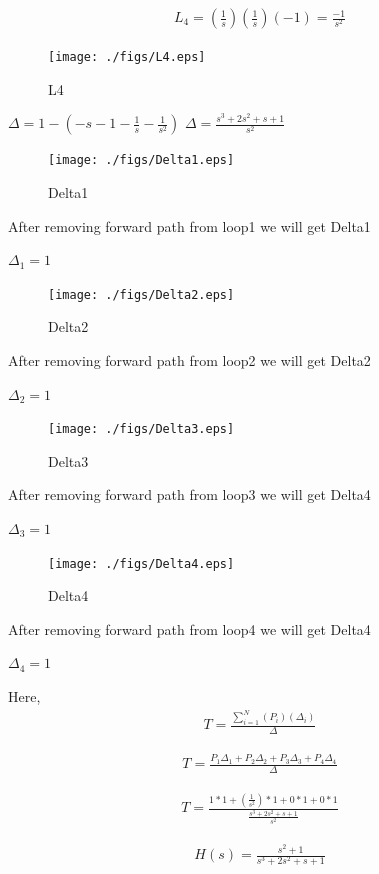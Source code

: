 \begin{enumerate}[label=\thesection.\arabic*.,ref=\thesection.\theenumi]
\begin{align}
L_4=(\frac{1}{s})(\frac{1}{s})(-1)=\frac{-1}{s^2}
\end{align}

\begin{figure}[!ht]
\centering
\texttt{[image: ./figs/L4.eps]}
\caption{L4}
\label{fig:sec_order}
\end{figure}


$\Delta = 1-(-s-1-\frac{1}{s}-\frac{1}{s^2})$
$\Delta = \frac{s^3+2s^2+s+1}{s^2}$

\begin{figure}[!ht]
\centering
\texttt{[image: ./figs/Delta1.eps]}
\caption{Delta1}
\label{fig:sec_order}
\end{figure}

After removing forward path from loop1 we will get Delta1

$\Delta_1 = 1$

\begin{figure}[!ht]
\centering
\texttt{[image: ./figs/Delta2.eps]}
\caption{Delta2}
\label{fig:sec_order}
\end{figure}

After removing forward path from loop2 we will get Delta2

$\Delta_2 = 1$

\begin{figure}[!ht]
\centering
\texttt{[image: ./figs/Delta3.eps]}
\caption{Delta3}
\label{fig:sec_order}
\end{figure}

After removing forward path from loop3 we will get Delta4

$\Delta_3 = 1$

\begin{figure}[!ht]
\centering
\texttt{[image: ./figs/Delta4.eps]}
\caption{Delta4}
\label{fig:sec_order}
\end{figure}

After removing forward path from loop4 we will get Delta4

$\Delta_4 = 1$

Here, 
\begin{align}
T=\frac{\sum_{i=1}^{N}(P_i)(\Delta_i)}{\Delta}
\end{align}

\begin{align}
T=\frac{P_1 \Delta_1+P_2 \Delta_2+P_3 \Delta_3+P_4 \Delta_4}{\Delta}
\end{align}

\begin{align}
T=\frac{1*1 +(\frac{1}{s^2})*1 + 0*1 + 0*1 }{\frac{s^3+2s^2+s+1}{s^2}}
\end{align}

\begin{align}
H(s)=\frac{s^2+1}{s^3+2s^2+s+1}
\end{align}
\renewcommand{\thefigure}{\theenumi}

\end{enumerate}
